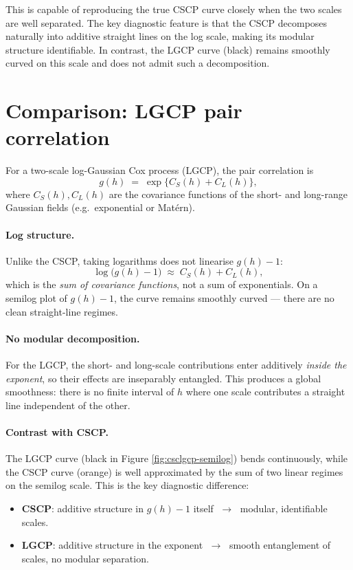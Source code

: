 \documentclass[11pt]{article}
\begin{document}
This is capable of reproducing the true CSCP curve closely when the two scales are well separated. The key diagnostic feature is that the CSCP decomposes naturally into additive straight lines on the log scale, making its modular structure identifiable. In contrast, the LGCP curve (black) remains smoothly curved on this scale and does not admit such a decomposition.

\section{Comparison: LGCP pair correlation}

For a two-scale log-Gaussian Cox process (LGCP), the pair correlation is
\[
g(h) \;=\; \exp\!\Big\{ C_S(h) + C_L(h) \Big\},
\]
where $C_S(h), C_L(h)$ are the covariance functions of the short- and long-range Gaussian fields (e.g.\ exponential or Matérn).  

\paragraph{Log structure.}
Unlike the CSCP, taking logarithms does not linearise $g(h)-1$:
\[
\log\!\big( g(h)-1 \big) \;\approx\; C_S(h) + C_L(h),
\]
which is the \emph{sum of covariance functions}, not a sum of exponentials.  
On a semilog plot of $g(h)-1$, the curve remains smoothly curved — there are no clean straight-line regimes.

\paragraph{No modular decomposition.}
For the LGCP, the short- and long-scale contributions enter additively \emph{inside the exponent}, so their effects are inseparably entangled. This produces a global smoothness: there is no finite interval of $h$ where one scale contributes a straight line independent of the other.

\paragraph{Contrast with CSCP.}
The LGCP curve (black in Figure \ref{fig:csclgcp-semilog}) bends continuously, while the CSCP curve (orange) is well approximated by the sum of two linear regimes on the semilog scale.  
This is the key diagnostic difference:
\begin{itemize}
	\item \textbf{CSCP}: additive structure in $g(h)-1$ itself $\;\to\;$ modular, identifiable scales.
	\item \textbf{LGCP}: additive structure in the exponent $\;\to\;$ smooth entanglement of scales, no modular separation.
\end{itemize}
\end{document}

